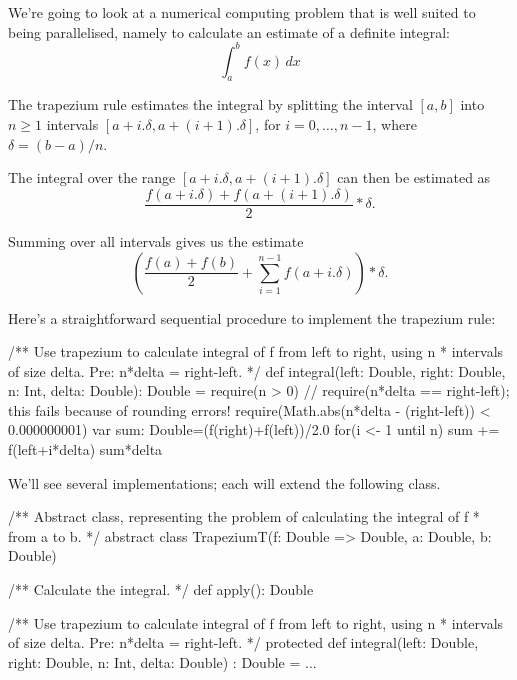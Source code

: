 
\begin{slide}

We're going to look at a numerical computing problem that is well suited to
being parallelised, namely to calculate an estimate of a definite integral:
\[
\int_a^b f(x) \, dx
\]
\end{slide}


\begin{slide}

The trapezium rule estimates the integral by splitting the interval $[a,b]$
into $n \ge 1$ intervals $[a+i.\delta, a+(i+1).\delta]$, for
$i = 0, \ldots, n-1$, where $\delta = (b-a)/n$.

The integral over the range $[a+i.\delta, a+(i+1).\delta]$ can then be
estimated as 
\[
\frac{f(a+i.\delta)+f(a+(i+1).\delta)}{2} * \delta.
\]

Summing over all intervals gives us the estimate
\[
\left( \frac{f(a)+f(b)}{2} + \sum_{i=1}^{n-1} f(a+i.\delta) \right) * \delta.
\]
\end{slide}  


\begin{slide}

Here's a straightforward sequential procedure to implement the trapezium rule:
\begin{scala}
  /** Use trapezium to calculate integral of f from left to right, using n
    * intervals of size delta.  Pre: n*delta = right-left. */
  def integral(left: Double, right: Double, n: Int, delta: Double): Double = {
    require(n > 0)
    // require(n*delta == right-left); this fails because of rounding errors!
    require(Math.abs(n*delta - (right-left)) < 0.000000001)
    var sum: Double=(f(right)+f(left))/2.0
    for(i <- 1 until n) sum += f(left+i*delta)
    sum*delta
  }
\end{scala}
\end{slide}  


\begin{slide}

We'll see several implementations; each will extend the following class. 
%
\begin{scala}
/** Abstract class, representing the problem of calculating the integral of f
  * from a to b. */
abstract class TrapeziumT(f: Double => Double, a: Double, b: Double){
  /** Calculate the integral. */
  def apply(): Double

  /** Use trapezium to calculate integral of f from left to right, using n
    * intervals of size delta.  Pre: n*delta = right-left. */
  protected def integral(left: Double, right: Double, n: Int, delta: Double)
    : Double = ...
}
\end{scala}
\end{slide}

